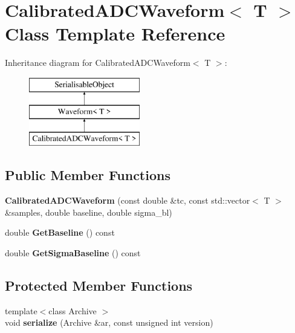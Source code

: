 \hypertarget{classCalibratedADCWaveform}{\section{Calibrated\-A\-D\-C\-Waveform$<$ T $>$ Class Template Reference}
\label{classCalibratedADCWaveform}
}
Inheritance diagram for Calibrated\-A\-D\-C\-Waveform$<$ T $>$\-:\begin{figure}[H]
\begin{center}
\leavevmode
\includegraphics[height=3.000000cm]{classCalibratedADCWaveform}
\end{center}
\end{figure}
\subsection*{Public Member Functions}
\begin{DoxyCompactItemize}
\item 
\hypertarget{classCalibratedADCWaveform_ab8d6abbf935c75db5de184c5a3291ef6}{{\bfseries Calibrated\-A\-D\-C\-Waveform} (const double \&tc, const std\-::vector$<$ T $>$ \&samples, double baseline, double sigma\-\_\-bl)}\label{classCalibratedADCWaveform_ab8d6abbf935c75db5de184c5a3291ef6}

\item 
\hypertarget{classCalibratedADCWaveform_ae22d006546a5666eafd89d361a470798}{double {\bfseries Get\-Baseline} () const }\label{classCalibratedADCWaveform_ae22d006546a5666eafd89d361a470798}

\item 
\hypertarget{classCalibratedADCWaveform_a5afc74fd628dd6d70d60378467092e9d}{double {\bfseries Get\-Sigma\-Baseline} () const }\label{classCalibratedADCWaveform_a5afc74fd628dd6d70d60378467092e9d}

\end{DoxyCompactItemize}
\subsection*{Protected Member Functions}
\begin{DoxyCompactItemize}
\item 
\hypertarget{classCalibratedADCWaveform_a0e5e7326913d63237fd12aee9221b269}{{\footnotesize template$<$class Archive $>$ }\\void {\bfseries serialize} (Archive \&ar, const unsigned int version)}\label{classCalibratedADCWaveform_a0e5e7326913d63237fd12aee9221b269}

\end{DoxyCompactItemize}
